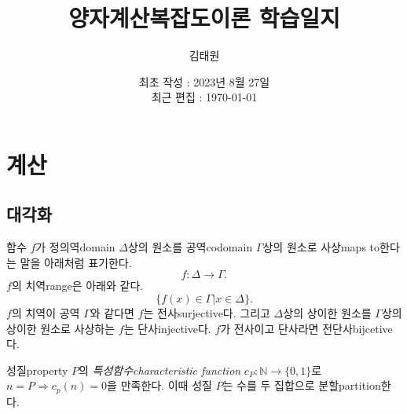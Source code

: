 \documentclass[a4paper,chapter,atbegshi]{oblivoir}
\title{양자계산복잡도이론 학습일지}
\author{김태원}
\date{최초 작성 : 2023년 8월 27일 \\ 최근 편집 : \today}
\begin{document}
\maketitle
\break
\tableofcontents
\chapter{계산}
\section{대각화}
함수 $f$가 정의역{\tiny domain} $\Delta$상의 원소를 공역{\tiny codomain} 
$\Gamma$상의 원소로 사상{\tiny maps to}한다는 말을 아래처럼 표기한다.
\[
  f:\Delta\rightarrow\Gamma.
\]
$f$의 치역{\tiny range}은 아래와 같다.
\[
  \{f(x)\in\Gamma|x\in\Delta\}.
\]
$f$의 치역이 공역 $\Gamma$와 같다면 $f$는 전사{\tiny surjective}다.
그리고 $\Delta$상의 상이한 원소를 $\Gamma$상의 상이한 원소로 사상하는 $f$는
단사{\tiny injective}다. $f$가 전사이고 단사라면 전단사{\tiny bijcetive}다.

성질{\tiny property} $P$의 \emph{특성함수\tiny characteristic function}
$c_P:\mathbb{N}\rightarrow\{0,1\}$로 $n=P\Rightarrow c_p(n)=0$을 만족한다. 
이때 성질 $P$는 수를 두 집합으로 분할{\tiny partition}한다.
\end{document}
